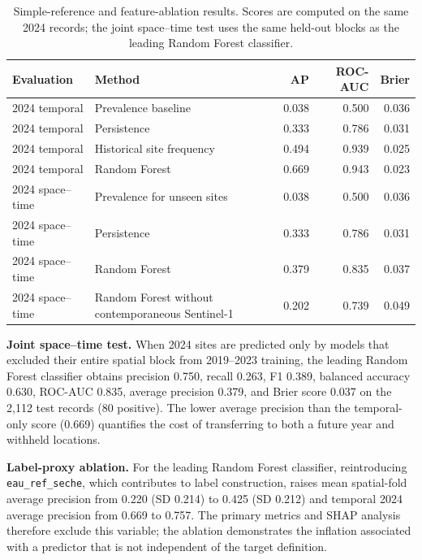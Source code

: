 \documentclass[pdflatex,sn-mathphys,Numbered]{sn-jnl}
\begin{document}
\begin{table}[t]
\centering
\caption{Simple-reference and feature-ablation results. Scores are computed on the same 2024 records; the joint space--time test uses the same held-out blocks as the leading Random Forest classifier.}
\label{tab:baselines}
\small
\begin{tabular}{llrrr}
\toprule
Evaluation & Method & AP & ROC-AUC & Brier \\
\midrule
2024 temporal & Prevalence baseline & 0.038 & 0.500 & 0.036 \\
2024 temporal & Persistence & 0.333 & 0.786 & 0.031 \\
2024 temporal & Historical site frequency & 0.494 & 0.939 & 0.025 \\
2024 temporal & Random Forest & 0.669 & 0.943 & 0.023 \\
2024 space--time & Prevalence for unseen sites & 0.038 & 0.500 & 0.036 \\
2024 space--time & Persistence & 0.333 & 0.786 & 0.031 \\
2024 space--time & Random Forest & 0.379 & 0.835 & 0.037 \\
2024 space--time & Random Forest without contemporaneous Sentinel-1 & 0.202 & 0.739 & 0.049 \\
\bottomrule
\end{tabular}
\end{table}

\noindent\textbf{Joint space--time test.} When 2024 sites are predicted only by models that excluded their entire spatial block from 2019--2023 training, the leading Random Forest classifier obtains precision 0.750, recall 0.263, F1 0.389, balanced accuracy 0.630, ROC-AUC 0.835, average precision 0.379, and Brier score 0.037 on the 2,112 test records (80 positive). The lower average precision than the temporal-only score (0.669) quantifies the cost of transferring to both a future year and withheld locations.

\noindent\textbf{Label-proxy ablation.} For the leading Random Forest classifier, reintroducing \texttt{eau\_ref\_seche}, which contributes to label construction, raises mean spatial-fold average precision from 0.220 (SD 0.214) to 0.425 (SD 0.212) and temporal 2024 average precision from 0.669 to 0.757. The primary metrics and SHAP analysis therefore exclude this variable; the ablation demonstrates the inflation associated with a predictor that is not independent of the target definition.
\end{document}
